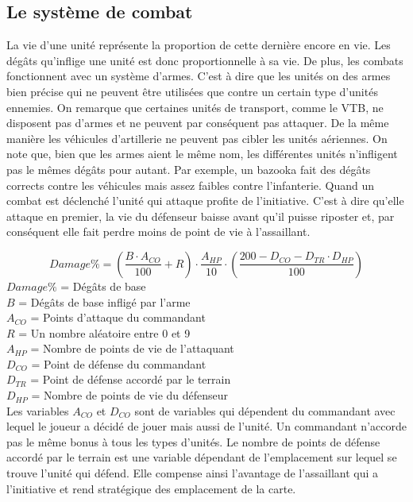 \documentclass[a4paper,10pt]{article} %
\begin{document}
\subsection{Le système de combat}
La vie d'une unité représente la proportion de cette dernière  encore en vie. Les dégâts qu'inflige une unité est donc proportionnelle à sa vie. De plus, les combats fonctionnent avec un système d'armes. C'est à dire que les unités on des armes bien précise qui ne peuvent être utilisées que contre un certain type d'unités ennemies. On remarque que certaines unités de transport, comme le VTB, ne disposent pas d'armes et ne peuvent par conséquent pas attaquer. De la même manière les véhicules d'artillerie ne peuvent pas cibler les unités aériennes.
On note que, bien que les armes aient le même nom, les différentes unités n'infligent pas le mêmes dégâts pour autant. Par exemple, un bazooka fait des dégâts corrects contre les véhicules mais assez faibles contre l’infanterie.
Quand un combat est déclenché l'unité qui attaque profite de l'initiative. C'est à dire qu'elle attaque en premier, la vie du défenseur baisse avant qu'il puisse riposter et, par conséquent elle fait perdre moins de point de vie à l’assaillant. 

$$Damage\%=\left(\frac{B\cdot A_{CO}}{100}+R\right)\cdot\frac{A_{HP}}{10}\cdot \left(\frac{200-D_{CO}-D_{TR}\cdot D_{HP}}{100}\right)$$
$Damage\%$ = Dégâts de base\\
$B$ = Dégâts de base infligé par l'arme\\ 
$A_{CO}$ = Points d'attaque du commandant\\
$R$ = Un nombre aléatoire entre 0 et 9\\
$A_{HP}$ = Nombre de points de vie de l'attaquant\\
$D_{CO}$ = Point de défense du commandant\\
$D_{TR}$ = Point de défense accordé par le terrain\\
$D_{HP}$ = Nombre de points de vie du défenseur\\

Les variables $A_{CO}$ et $D_{CO}$ sont de variables qui dépendent du commandant avec lequel le joueur a décidé de jouer mais aussi de l'unité. Un commandant n'accorde pas le même bonus à tous les types d'unités. Le nombre de points de défense accordé par le terrain est une variable dépendant de l'emplacement sur lequel se trouve l'unité qui défend. Elle compense ainsi l'avantage de l'assaillant qui a l'initiative et rend stratégique des emplacement de la carte.\\
\end{document}
